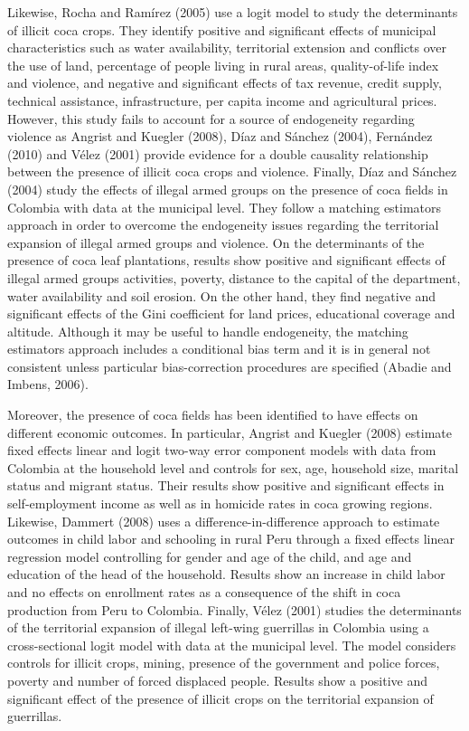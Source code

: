 \documentclass[a4paper, 12pt]{article}
\begin{document}
Likewise, Rocha and Ram\'{i}rez (2005) use a logit model to study the determinants of illicit coca crops. They identify positive and significant effects of municipal characteristics such as water availability, territorial extension and conflicts over the use of land, percentage of people living in rural areas, quality-of-life index and violence, and negative and significant effects of tax revenue, credit supply, technical assistance, infrastructure, per capita income and agricultural prices. However, this study fails to account for a source of endogeneity regarding violence as Angrist and Kuegler (2008), D\'{i}az and S\'{a}nchez (2004), Fern\'{a}ndez (2010) and V\'{e}lez (2001) provide evidence for a double causality relationship between the presence of illicit coca crops and violence. Finally, D\'{i}az and S\'{a}nchez (2004) study the effects of illegal armed groups on the presence of coca fields in Colombia with data at the municipal level. They follow a matching estimators approach in order to overcome the endogeneity issues regarding the territorial expansion of illegal armed groups and violence. On the determinants of the presence of coca leaf plantations, results show positive and significant effects of illegal armed groups activities, poverty, distance to the capital of the department, water availability and soil erosion. On the other hand, they find negative and significant effects of the Gini coefficient for land prices, educational coverage and altitude.  Although it may be useful to handle endogeneity, the matching estimators approach includes a conditional bias term and it is in general not consistent unless particular bias-correction procedures are specified (Abadie and Imbens, 2006).

Moreover, the presence of coca fields has been identified to have effects on different economic outcomes. In particular, Angrist and Kuegler (2008) estimate fixed effects linear and logit two-way error component models with data from Colombia at the household level and controls for sex, age, household size, marital status and migrant status. Their results show positive and significant effects in self-employment income as well as in homicide rates in coca growing regions. Likewise, Dammert (2008) uses a difference-in-difference approach to estimate outcomes in child labor and schooling in rural Peru through a fixed effects linear regression model controlling for gender and age of the child, and age and education of the head of the household. Results show an increase in child labor and no effects on enrollment rates as a consequence of the shift in coca production from Peru to Colombia. Finally, V\'{e}lez (2001) studies the determinants of the territorial expansion of illegal left-wing guerrillas in Colombia using a cross-sectional logit model with data at the municipal level. The model considers controls for illicit crops, mining, presence of the government and police forces, poverty and number of forced displaced people. Results show a positive and significant effect of the presence of illicit crops on the territorial expansion of guerrillas. 
\end{document}
